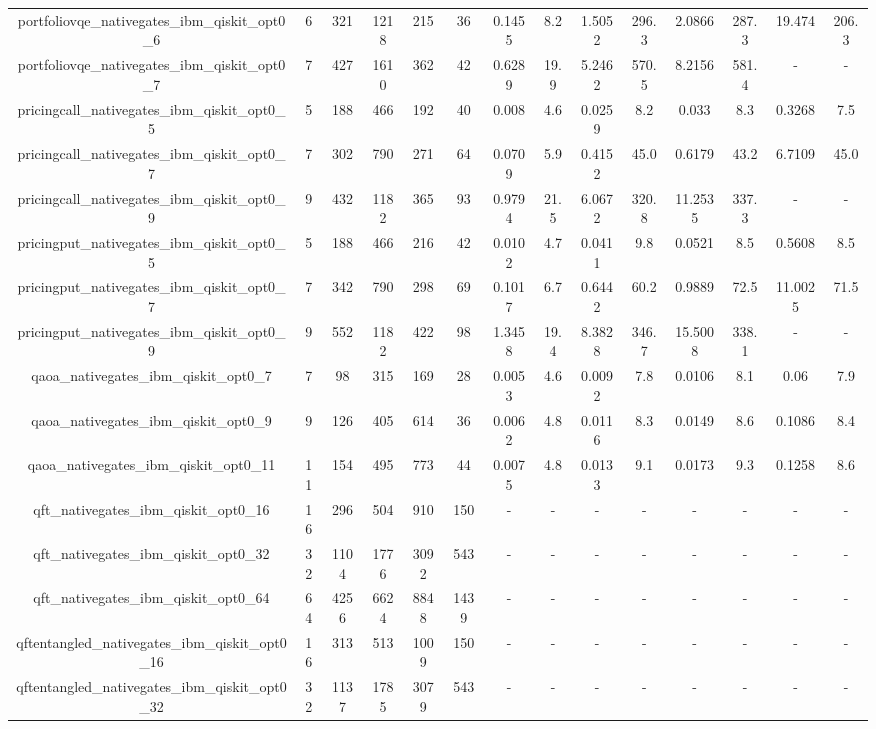 \begin{table}[htb]
{\begin{tabular}{|c|c|c|c|c|c|c|c|c|c|c|c|c|c|}
portfoliovqe\_nativegates\_ibm\_qiskit\_opt0\_6 & 6 & 321 & 1218 & 215 & 36 & 0.1455 & 8.2 & 1.5052 & 296.3 & 2.0866 & 287.3 & 19.474 & 206.3 \\ 
portfoliovqe\_nativegates\_ibm\_qiskit\_opt0\_7 & 7 & 427 & 1610 & 362 & 42 & 0.6289 & 19.9 & 5.2462 & 570.5 & 8.2156 & 581.4 & - & - \\ 
pricingcall\_nativegates\_ibm\_qiskit\_opt0\_5 & 5 & 188 & 466 & 192 & 40 & 0.008 & 4.6 & 0.0259 & 8.2 & 0.033 & 8.3 & 0.3268 & 7.5 \\ 
pricingcall\_nativegates\_ibm\_qiskit\_opt0\_7 & 7 & 302 & 790 & 271 & 64 & 0.0709 & 5.9 & 0.4152 & 45.0 & 0.6179 & 43.2 & 6.7109 & 45.0 \\ 
pricingcall\_nativegates\_ibm\_qiskit\_opt0\_9 & 9 & 432 & 1182 & 365 & 93 & 0.9794 & 21.5 & 6.0672 & 320.8 & 11.2535 & 337.3 & - & - \\ 
pricingput\_nativegates\_ibm\_qiskit\_opt0\_5 & 5 & 188 & 466 & 216 & 42 & 0.0102 & 4.7 & 0.0411 & 9.8 & 0.0521 & 8.5 & 0.5608 & 8.5 \\ 
pricingput\_nativegates\_ibm\_qiskit\_opt0\_7 & 7 & 342 & 790 & 298 & 69 & 0.1017 & 6.7 & 0.6442 & 60.2 & 0.9889 & 72.5 & 11.0025 & 71.5 \\ 
pricingput\_nativegates\_ibm\_qiskit\_opt0\_9 & 9 & 552 & 1182 & 422 & 98 & 1.3458 & 19.4 & 8.3828 & 346.7 & 15.5008 & 338.1 & - & - \\ 
qaoa\_nativegates\_ibm\_qiskit\_opt0\_7 & 7 & 98 & 315 & 169 & 28 & 0.0053 & 4.6 & 0.0092 & 7.8 & 0.0106 & 8.1 & 0.06 & 7.9 \\ 
qaoa\_nativegates\_ibm\_qiskit\_opt0\_9 & 9 & 126 & 405 & 614 & 36 & 0.0062 & 4.8 & 0.0116 & 8.3 & 0.0149 & 8.6 & 0.1086 & 8.4 \\ 
qaoa\_nativegates\_ibm\_qiskit\_opt0\_11 & 11 & 154 & 495 & 773 & 44 & 0.0075 & 4.8 & 0.0133 & 9.1 & 0.0173 & 9.3 & 0.1258 & 8.6 \\ 
qft\_nativegates\_ibm\_qiskit\_opt0\_16 & 16 & 296 & 504 & 910 & 150 & - & - & - & - & - & - & - & - \\ 
qft\_nativegates\_ibm\_qiskit\_opt0\_32 & 32 & 1104 & 1776 & 3092 & 543 & - & - & - & - & - & - & - & - \\ 
qft\_nativegates\_ibm\_qiskit\_opt0\_64 & 64 & 4256 & 6624 & 8848 & 1439 & - & - & - & - & - & - & - & - \\ 
qftentangled\_nativegates\_ibm\_qiskit\_opt0\_16 & 16 & 313 & 513 & 1009 & 150 & - & - & - & - & - & - & - & - \\ 
qftentangled\_nativegates\_ibm\_qiskit\_opt0\_32 & 32 & 1137 & 1785 & 3079 & 543 & - & - & - & - & - & - & - & - \\ 

\end{tabular}}
\end{table}
